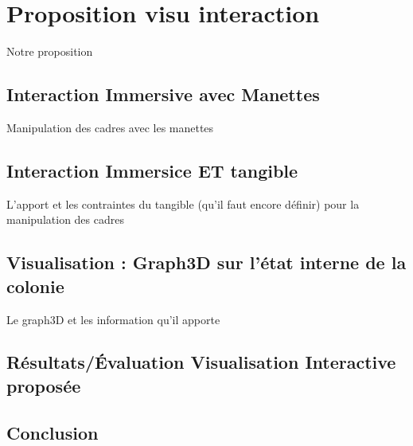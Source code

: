 \chapter{Proposition visu interaction}
	Notre proposition
	\section{Interaction Immersive avec Manettes}
		Manipulation des cadres avec les manettes
	\section{Interaction Immersice ET tangible}
		L'apport et les contraintes du tangible (qu'il faut encore définir) pour la manipulation des cadres
	\section{Visualisation : Graph3D sur l'état interne de la colonie}
		Le graph3D et les information qu'il apporte
	\section{Résultats/Évaluation Visualisation Interactive proposée}
	\label{sectionExpe}
	
			
	\section*{Conclusion}
	